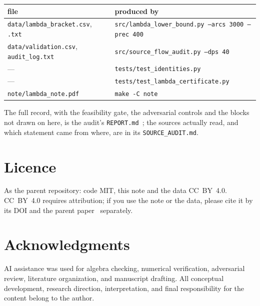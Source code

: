 \documentclass[11pt,a4paper]{article}
\theoremstyle{remark}
\newcommand{\src}[1]{{\footnotesize\texttt{#1}}}
\begin{document}
\begin{center}
\begin{tabular}{@{}ll@{}}
\toprule
file & produced by \\
\midrule
\src{data/lambda\_bracket.csv}, \src{.txt} & \src{src/lambda\_lower\_bound.py --arcs 3000 --prec 400} \\
\src{data/validation.csv}, \src{audit\_log.txt} & \src{src/source\_flow\_audit.py --dps 40} \\
--- & \src{tests/test\_identities.py} \\
--- & \src{tests/test\_lambda\_certificate.py} \\
\src{note/lambda\_note.pdf} & \src{make -C note} \\
\bottomrule
\end{tabular}
\end{center}

\noindent The full record, with the feasibility gate, the adversarial controls and the
blocks not drawn on here, is the audit's \src{REPORT.md}~\cite{audit}; the sources actually
read, and which statement came from where, are in its \src{SOURCE\_AUDIT.md}.

\section*{Licence}

As the parent repository: code MIT, this note and the data CC~BY~4.0. CC~BY~4.0 requires
attribution; if you use the note or the data, please cite it by its DOI and the parent
paper~\cite{deltaL3} separately.

\section*{Acknowledgments}

AI assistance was used for algebra checking, numerical verification, adversarial review,
literature organization, and manuscript drafting. All conceptual development, research
direction, interpretation, and final responsibility for the content belong to the author.
\end{document}
